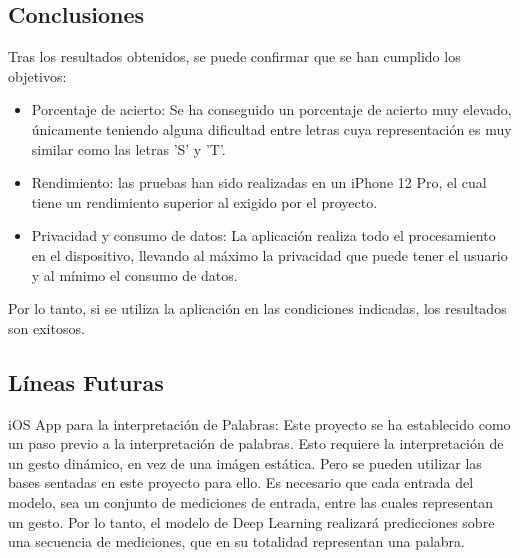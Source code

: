 \documentclass[../main.tex]{subfiles}
\begin{document}
\subsection{Conclusiones}

Tras los resultados obtenidos, se puede confirmar que se han cumplido los objetivos:

\begin{itemize}
    \item Porcentaje de acierto: Se ha conseguido un porcentaje de acierto muy elevado, únicamente teniendo alguna dificultad entre letras cuya representación es muy similar como las letras 'S' y 'T'.
    \item Rendimiento: las pruebas han sido realizadas en un iPhone 12 Pro, el cual tiene un rendimiento superior al exigido por el proyecto. 
    \item Privacidad y consumo de datos: La aplicación realiza todo el procesamiento en el dispositivo, llevando al máximo la privacidad que puede tener el usuario y al mínimo el consumo de datos.
\end{itemize}

Por lo tanto, si se utiliza la aplicación en las condiciones indicadas, los resultados son exitosos.

\subsection{Líneas Futuras}

iOS App para la interpretación de Palabras: Este proyecto se ha establecido como un paso previo a la interpretación de palabras. Esto requiere la interpretación de un gesto dinámico, en vez de una imágen estática. Pero se pueden utilizar las bases sentadas en este proyecto para ello. Es necesario que cada entrada del modelo, sea un conjunto de mediciones de entrada, entre las cuales representan un gesto. Por lo tanto, el modelo de Deep Learning realizará predicciones sobre una secuencia de mediciones, que en su totalidad representan una palabra. 
\end{document}
